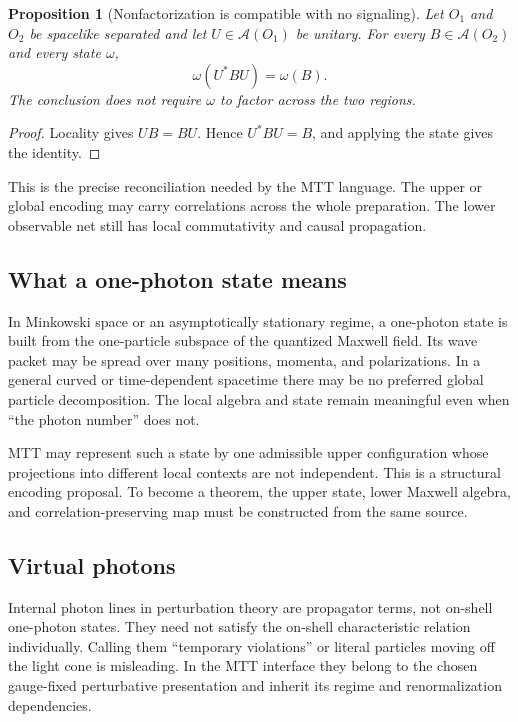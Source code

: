 \documentclass[11pt,a4paper]{article}
\numberwithin{equation}{section}
\newtheorem{proposition}[theorem]{Proposition}
\theoremstyle{definition}
\theoremstyle{remark}
\newcommand{\cA}{\mathcal A}
\begin{document}
\begin{proposition}[Nonfactorization is compatible with no signaling]
\label{prop:no-signaling}
Let \(O_1\) and \(O_2\) be spacelike separated and let
\(U\in\cA(O_1)\) be unitary.  For every \(B\in\cA(O_2)\) and every state
\(\omega\),
\[
\omega(U^*BU)=\omega(B).
\]
The conclusion does not require \(\omega\) to factor across the two
regions.
\end{proposition}

\begin{proof}
Locality gives \(UB=BU\).  Hence \(U^*BU=B\), and applying the state gives
the identity.
\end{proof}

This is the precise reconciliation needed by the MTT language.  The
upper or global encoding may carry correlations across the whole
preparation.  The lower observable net still has local commutativity and
causal propagation.

\subsection{What a one-photon state means}

In Minkowski space or an asymptotically stationary regime, a one-photon
state is built from the one-particle subspace of the quantized Maxwell
field.  Its wave packet may be spread over many positions, momenta, and
polarizations.  In a general curved or time-dependent spacetime there may
be no preferred global particle decomposition.  The local algebra and
state remain meaningful even when ``the photon number'' does not.

MTT may represent such a state by one admissible upper configuration
whose projections into different local contexts are not independent.
This is a structural encoding proposal.  To become a theorem, the upper
state, lower Maxwell algebra, and correlation-preserving map must be
constructed from the same source.

\subsection{Virtual photons}

Internal photon lines in perturbation theory are propagator terms, not
on-shell one-photon states.  They need not satisfy the on-shell
characteristic relation individually.  Calling them ``temporary
violations'' or literal particles moving off the light cone is
misleading.  In the MTT interface they belong to the chosen
gauge-fixed perturbative presentation and inherit its regime and
renormalization dependencies.
\end{document}

